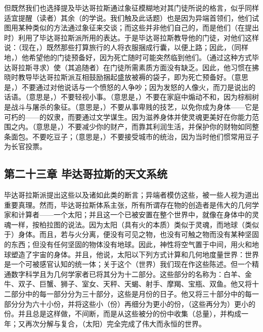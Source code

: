 但既然我们也选择提及毕达哥拉斯通过象征模糊地对其门徒所说的格言，似乎同样适宜提醒（读者）其余（的学说。我们触及此话题）也是因为异端首领们，他们试图用某种类似的方法通过象征来交谈；而这些并非他们自己的，而是他们（在提出时）利用了毕达哥拉斯派所用的表达。于是毕达哥拉斯教导他的门徒，对他们这样说：（现在，）既然那些打算旅行的人将衣服捆成行囊，以便上路；因此，（同样地，）他希望他的门徒预备好，因为死亡随时可能突然临到他们。（通过这种方式毕达哥拉斯寻求）使（其追随者）在门徒所需素质方面没有缺乏。因此，他习惯在拂晓时教导毕达哥拉斯派互相鼓励捆起盛放被褥的袋子，即为死亡预备好。（意思是，）不要通过对他说话与一个愤怒的人争吵；因为发怒的人像火，而刀是说出的话语。（意思是，）不要轻视小事。（意思是，）不要在家庭中煽动不和，因为棕榈树是战斗与屠杀的象征。（意思是，）不要从事卑贱的技艺，以免你成为身体——它是可朽的——的奴隶，而要通过文学谋生。因为滋养身体并使灵魂更美好在你能力范围之内。（意思是，）不要减少你的财产，而靠其利润生活，并保护你的财物如同整条面包。不要吃豆子；（意思是，）不要接受城市的统治，因为当时他们惯常用豆子为长官投票。\par


\subsection{第二十三章 毕达哥拉斯的天文系统}

毕达哥拉斯派提出这些以及诸如此类的断言；异端者模仿这些，被一些人视为道出重要真理。然而，毕达哥拉斯体系主张，所有所谓存在物的创造者是伟大的几何学家和计算者——一个太阳；并且这一个已被安置在整个世界中，就像在身体中的灵魂一样，按柏拉图的说法。因为太阳（具有火的本质）类似于灵魂，而地球（类似于）身体。而且，若与火分离，便没有可见之物，也没有可触之物而没有某种坚固的东西；但没有任何坚固的物体没有地球。因此，神性将空气置于中间，用火和地球塑造了宇宙的身体。并且，他说，太阳以下列方式计算和几何地度量世界：世界是一个可被感官认知的统一体；关于这个（世界）我们现在作这些陈述。但一个精通数字科学且为几何学家者已将其分为十二部分。这些部分的名称为：白羊、金牛、双子、巨蟹、狮子、室女、天秤、天蝎、射手、摩羯、宝瓶、双鱼。他又将十二部分中的每一部分分为三十部分，这些是月份的日子。他又将三十部分中的每一部分分为六十小份，并将这些小（份）再细分为更小的份，（这些再分为）更小的份。并且总是这样做，不间断，而是从这些被分的份中收集（总量），并构成一年；又再次分解与复合，（太阳）完全完成了伟大而永恒的世界。\par

